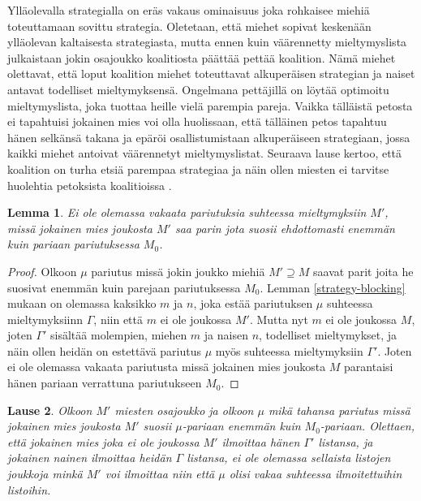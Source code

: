 \documentclass[finnish]{tktltiki2}
\newtheorem{lau}{Lause}
\newtheorem{lem}[lau]{Lemma}
\theoremstyle{definition}
\theoremstyle{remark}
\begin{document}
Ylläolevalla strategialla on eräs vakaus ominaisuus joka rohkaisee miehiä toteuttamaan sovittu strategia. Oletetaan, että miehet sopivat keskenään ylläolevan kaltaisesta strategiasta, mutta ennen kuin väärennetty mieltymyslista julkaistaan jokin osajoukko koalitiosta päättää pettää koalition. Nämä miehet olettavat, että loput koalition miehet toteuttavat alkuperäisen strategian ja naiset antavat todelliset mieltymyksensä. Ongelmana pettäjillä on löytää optimoitu mieltymyslista, joka tuottaa heille vielä parempia pareja. Vaikka tälläistä petosta ei tapahtuisi jokainen mies voi olla huolissaan, että tälläinen petos tapahtuu hänen selkänsä takana ja epäröi osallistumistaan alkuperäiseen strategiaan, jossa kaikki miehet antoivat väärennetyt mieltymyslistat. Seuraava lause kertoo, että koalition on turha etsiä parempaa strategiaa ja näin ollen miesten ei tarvitse huolehtia petoksista koalitioissa \cite{gusfield1989stable}.

\begin{lem}\cite[s. 56]{gusfield1989stable}\label{strategy-gus}
	Ei ole olemassa vakaata pariutuksia suhteessa mieltymyksiin $M'$, missä jokainen mies joukosta $M'$ saa parin jota suosii ehdottomasti enemmän kuin pariaan pariutuksessa $M_0$.
\end{lem}

\begin{proof}\cite[s. 56]{gusfield1989stable}
	Olkoon $\mu$ pariutus missä jokin joukko miehiä $M' \supseteq M$ saavat parit joita he suosivat enemmän kuin parejaan pariutuksessa $M_0$. Lemman \ref{strategy-blocking} mukaan on olemassa kaksikko $m$ ja $n$, joka estää pariutuksen $\mu$ suhteessa mieltymyksiinn $\Gamma$, niin että $m$ ei ole joukossa $M'$. Mutta nyt $m$ ei ole joukossa $M$, joten $\Gamma'$ sisältää molempien, miehen $m$ ja naisen $n$, todelliset mieltymykset, ja näin ollen heidän on estettävä pariutus $\mu$ myös suhteessa mieltymyksiin $\Gamma'$. Joten ei ole olemassa vakaata pariutusta missä jokainen mies joukosta $M$ parantaisi hänen pariaan verrattuna pariutukseen $M_0$. 
\end{proof}

\begin{lau}\cite[s. 58]{gusfield1989stable}
	Olkoon $M'$ miesten osajoukko ja olkoon $\mu$ mikä tahansa pariutus missä jokainen mies joukosta $M'$ suosii $\mu$-pariaan enemmän kuin $M_0$-pariaan. Olettaen, että jokainen mies joka ei ole joukossa $M'$ ilmoittaa hänen $\Gamma'$ listansa, ja jokainen nainen ilmoittaa heidän $\Gamma$ listansa, ei ole olemassa sellaista listojen joukkoja minkä $M'$ voi ilmoittaa niin että $\mu$ olisi vakaa suhteessa ilmoitettuihin listoihin.
\end{lau}
\end{document}

